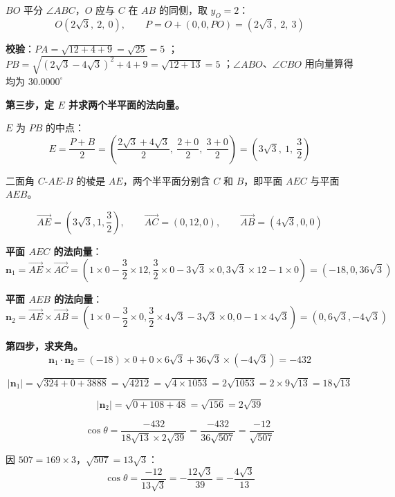 \begin{answer}
$BO$ 平分 $\angle ABC$，$O$ 应与 $C$ 在 $AB$ 的同侧，取 $y_O=2$：
\nopagebreak[4]
\[O\left(2\sqrt3,\ 2,\ 0\right),\qquad P=O+(0,0,PO)=\left(2\sqrt3,\ 2,\ 3\right)\]

\textbf{校验}：$PA=\sqrt{12+4+9}=\sqrt{25}=5$ ；$PB=\sqrt{\left(2\sqrt3-4\sqrt3\right)^{2}+4+9}=\sqrt{12+13}=5$ ；$\angle ABO$、$\angle CBO$ 用向量算得均为 $30.0000^\circ$ 

\textbf{第三步，定 $E$ 并求两个半平面的法向量。}

$E$ 为 $PB$ 的中点：
\nopagebreak[4]
\[E=\frac{P+B}2=\left(\frac{2\sqrt3+4\sqrt3}2,\ \frac{2+0}2,\ \frac{3+0}2\right)=\left(3\sqrt3,\ 1,\ \frac32\right)\]

二面角 $C\text{-}AE\text{-}B$ 的棱是 $AE$，两个半平面分别含 $C$ 和 $B$，即平面 $AEC$ 与平面 $AEB$。

\nopagebreak[4]
\[\overrightarrow{AE}=\left(3\sqrt3,1,\frac32\right),\qquad\overrightarrow{AC}=(0,12,0),\qquad\overrightarrow{AB}=\left(4\sqrt3,0,0\right)\]

\textbf{平面 $AEC$ 的法向量}：
\nopagebreak[4]
\[\boldsymbol n_1=\overrightarrow{AE}\times\overrightarrow{AC}=\left(1\times0-\frac32\times12,\frac32\times0-3\sqrt3\times0,3\sqrt3\times12-1\times0\right)=\left(-18,0,36\sqrt3\right)\]

\textbf{平面 $AEB$ 的法向量}：
\nopagebreak[4]
\[\boldsymbol n_2=\overrightarrow{AE}\times\overrightarrow{AB}=\left(1\times0-\frac32\times0,\frac32\times4\sqrt3-3\sqrt3\times0,0-1\times4\sqrt3\right)=\left(0,6\sqrt3,-4\sqrt3\right)\]

\textbf{第四步，求夹角。}
\nopagebreak[4]
\[\boldsymbol n_1\cdot\boldsymbol n_2=(-18)\times0+0\times6\sqrt3+36\sqrt3\times\left(-4\sqrt3\right)=-432\]

\nopagebreak[4]
\[\left|\boldsymbol n_1\right|=\sqrt{324+0+3888}=\sqrt{4212}=\sqrt{4\times1053}=2\sqrt{1053}=2\times9\sqrt{13}=18\sqrt{13}\]

\nopagebreak[4]
\[\left|\boldsymbol n_2\right|=\sqrt{0+108+48}=\sqrt{156}=2\sqrt{39}\]

\nopagebreak[4]
\[\cos\theta=\frac{-432}{18\sqrt{13}\times2\sqrt{39}}=\frac{-432}{36\sqrt{507}}=\frac{-12}{\sqrt{507}}\]

因 $507=169\times3$，$\sqrt{507}=13\sqrt3$：
\nopagebreak[4]
\[\cos\theta=\frac{-12}{13\sqrt3}=-\frac{12\sqrt3}{39}=-\frac{4\sqrt3}{13}\]


\end{answer}
